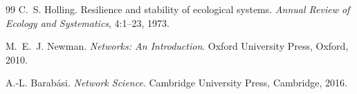 \documentclass[12pt, a4paper]{article}
\theoremstyle{essaystyle}
\begin{document}
\begin{thebibliography}{99}
C.~S. Holling.
\newblock Resilience and stability of ecological systems.
\newblock \textit{Annual Review of Ecology and Systematics}, 4:1--23, 1973.

M.~E.~J. Newman.
\newblock \textit{Networks: An Introduction}.
\newblock Oxford University Press, Oxford, 2010.

A.-L. Barab\'asi.
\newblock \textit{Network Science}.
\newblock Cambridge University Press, Cambridge, 2016.

\end{thebibliography}
\end{document}

